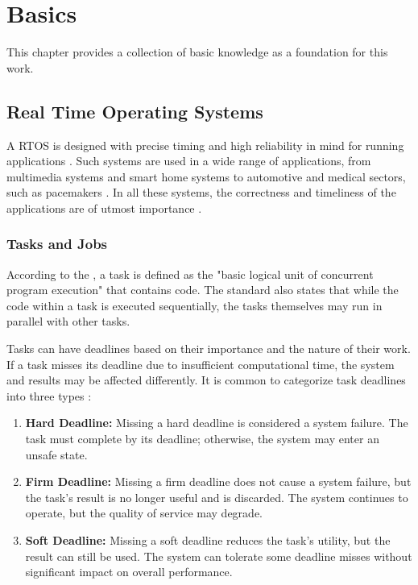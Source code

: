 \chapter{Basics}
This chapter provides a collection of basic knowledge as a foundation for this work.

\section{Real Time Operating Systems}
\label{sec:rtos}
A \ac{RTOS} is designed with precise timing and high reliability in mind for running applications \textcite{stankovicRealtimeOperatingSystems2004}. 
Such systems are used in a wide range of applications, from multimedia systems and smart home systems to automotive and medical sectors, such as pacemakers \cite{hambardeSurveyRealTime2014}. 
In all these systems, the correctness and timeliness of the applications are of utmost importance \cite{hambardeSurveyRealTime2014}. 
\subsection{Tasks and Jobs}
\label{sec:tasks_and_jobs}
According to the , a task is defined as the "basic logical unit of concurrent program execution" that contains code. The standard also states that while the code within a task is executed sequentially, the tasks themselves may run in parallel with other tasks.

Tasks can have deadlines based on their importance and the nature of their work. If a task misses its deadline due to insufficient computational time, the system and results may be affected differently. It is common to categorize task deadlines into three types \cite{dengSchedulingRealtimeApplications1997,abeniIntegratingMultimediaApplications1998,shindeComparisonRealTime2017}:
\begin{enumerate}	
\item \textbf{Hard Deadline:} 
Missing a hard deadline is considered a system failure. The task must complete by its deadline; otherwise, the system may enter an unsafe state.
\item \textbf{Firm Deadline:} 
Missing a firm deadline does not cause a system failure, but the task's result is no longer useful and is discarded. The system continues to operate, but the quality of service may degrade.
\item \textbf{Soft Deadline:} 
Missing a soft deadline reduces the task's utility, but the result can still be used. The system can tolerate some deadline misses without significant impact on overall performance.
\end{enumerate}

